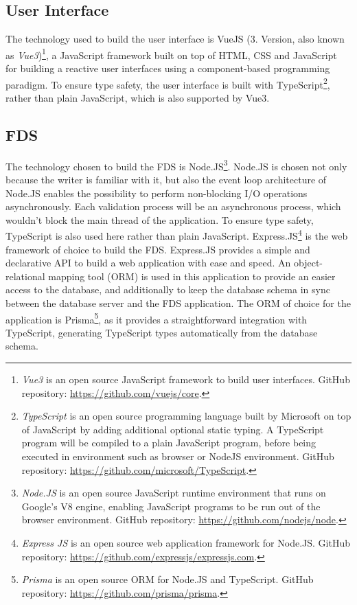  \subsection{User Interface}
  \label{concept_ui}

 The technology used to build the user interface is VueJS (3. Version, also known as \emph{Vue3})\footnote{\emph{Vue3} is an open source JavaScript framework to build user interfaces. GitHub repository: \url{https://github.com/vuejs/core}.}, a JavaScript framework built on top of HTML, CSS and JavaScript for building a reactive user interfaces using a component-based programming paradigm. To ensure type safety, the user interface is built with TypeScript\footnote{\emph{TypeScript} is an open source programming language built by Microsoft on top of JavaScript by adding additional optional static typing. A TypeScript program will be compiled to a plain JavaScript program, before being executed in environment such as browser or NodeJS environment. GitHub repository: \url{https://github.com/microsoft/TypeScript}.}, rather than plain JavaScript, which is also supported by Vue3.

 \subsection{FDS}
  \label{concept_fds}

 The technology chosen to build the FDS is Node.JS\footnote{\emph{Node.JS} is an open source JavaScript runtime environment that runs on Google's V8 engine, enabling JavaScript programs to be run out of the browser environment. GitHub repository: \url{https://github.com/nodejs/node}.}. Node.JS is chosen not only because the writer is familiar with it, but also the event loop architecture of Node.JS enables the possibility to perform non-blocking I/O operations asynchronously. Each validation process will be an asynchronous process, which wouldn't block the main thread of the application. To ensure type safety, TypeScript is also used here rather than plain JavaScript. Express.JS\footnote{\emph{Express JS} is an open source web application framework for Node.JS. GitHub repository: \url{https://github.com/expressjs/expressjs.com}.} is the web framework of choice to build the FDS. Express.JS provides a simple and declarative API to build a web application with ease and speed.
An object-relational mapping tool (ORM) is used in this application to provide an easier access to the database, and additionally to keep the database schema in sync between the database server and the FDS application. The ORM of choice for the application is Prisma\footnote{\emph{Prisma} is an open source ORM for Node.JS and TypeScript. GitHub repository: \url{https://github.com/prisma/prisma}.}, as it provides a straightforward integration with TypeScript, generating TypeScript types automatically from the database schema.

